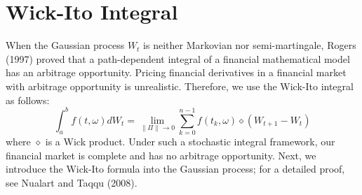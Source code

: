 \documentclass[preprint,12pt]{elsarticle}
\begin{document}
\section{Wick-Ito Integral}
When the Gaussian process $W_t$ is neither Markovian nor semi-martingale, Rogers (1997) proved that a path-dependent integral of a financial mathematical model has an arbitrage opportunity. Pricing financial derivatives in a financial market with arbitrage opportunity is unrealistic. Therefore, we use the Wick-Ito integral as follows:
\begin{equation}
\int_a^bf(t,\omega)dW_t=\lim_{\| \Pi\| \rightarrow0}\sum^{n-1}_{k=0}f(t_k,\omega)\diamond (W_{t+1}-W_t)
\end{equation}
where $\diamond$ is a Wick product. Under such a stochastic integral framework, our financial market is complete and has no arbitrage opportunity.
Next, we introduce the Wick-Ito formula into the Gaussian process; for a detailed proof, see Nualart and Taqqu (2008).
\end{document}

